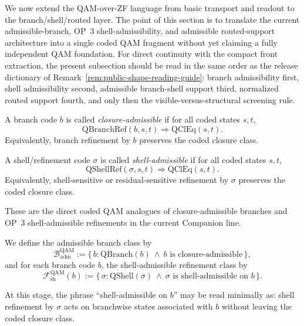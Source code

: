 We now extend the QAM-over-ZF language from basic transport and readout to the branch/shell/routed layer. The point of this section is to translate the current admissible-branch, OP~3 shell-admissibility, and admissible routed-support architecture into a single coded QAM fragment without yet claiming a fully independent QAM foundation. For direct continuity with the compact front extraction, the present subsection should be read in the same order as the release dictionary of Remark~\ref{rem:public-shape-reading-guide}: branch admissibility first, shell admissibility second, admissible branch-shell support third, normalized routed support fourth, and only then the visible-versus-structural screening rule.

\begin{definition}
A branch code $b$ is called \emph{closure-admissible} if for all coded states $s,t$,
\[
\mathrm{QBranchRef}(b,s,t)\Longrightarrow \mathrm{QClEq}(s,t).
\]
Equivalently, branch refinement by $b$ preserves the coded closure class.
\end{definition}

\begin{definition}
A shell/refinement code $\sigma$ is called \emph{shell-admissible} if for all coded states $s,t$,
\[
\mathrm{QShellRef}(\sigma,s,t)\Longrightarrow \mathrm{QClEq}(s,t).
\]
Equivalently, shell-sensitive or residual-sensitive refinement by $\sigma$ preserves the coded closure class.
\end{definition}

\begin{remark}
These are the direct coded QAM analogues of closure-admissible branches and OP~3 shell-admissible refinements in the current Companion line.
\end{remark}

\begin{definition}
We define the admissible branch class by
\[
\mathcal{B}^{\mathrm{QAM}}_{\mathrm{adm}}
:=
\{\,b:\mathrm{QBranch}(b)\ \wedge\ b\text{ is closure-admissible}\,\},
\]
and for each branch code $b$, the shell-admissible refinement class by
\[
\mathcal{F}^{\mathrm{QAM}}_{\mathrm{sh}}(b)
:=
\{\,\sigma:\mathrm{QShell}(\sigma)\ \wedge\ \sigma\text{ is shell-admissible on }b\,\}.
\]
\end{definition}

\begin{remark}
At this stage, the phrase ``shell-admissible on $b$'' may be read minimally as: shell refinement by $\sigma$ acts on branchwise states associated with $b$ without leaving the coded closure class.
\end{remark}

